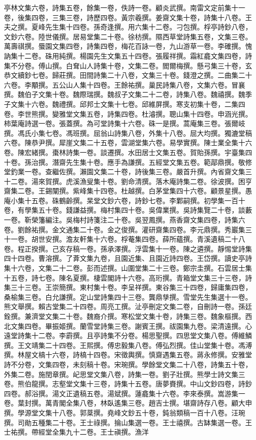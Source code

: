\begin{pinyinscope}
亭林文集六卷，詩集五卷，餘集一卷，佚詩一卷。顧炎武撰。南雷文定前集十一卷，後集四卷，三集三卷，詩歷四卷。黃宗羲撰。姜齋文集十卷，詩集十八卷。王夫之撰。夏峰先生集十四卷。孫奇逢撰。用六集十二卷。刁包撰。桴亭詩鈔八卷，文鈔六卷。陸世儀撰。居易堂集二十卷。徐枋撰。隰西草堂詩集五卷，文集三卷。萬壽祺撰。蜃園文集四卷，詩集四卷，梅花百詠一卷，九山游草一卷。李確撰。愧訥集十二卷。硃用純撰。楊園先生文集五十四卷。張履祥撰。霜紅龕文集四卷，詩集不分卷。傅山撰。白耷山人詩集十卷，文集二卷。閻爾梅撰。懸弓集三十卷，玄恭文續鈔七卷。歸莊撰。田間詩集二十八卷，文集三十卷。錢澄之撰。二曲集二十六卷。李顒撰。五公山人集十四卷。王餘祐撰。巢民詩集八卷，文集六卷。冒襄撰。魏伯子文集十卷。魏際瑞撰。魏叔子文集二十二卷，詩集八卷。魏禧撰。魏季子文集十六卷。魏禮撰。邱邦士文集十七卷。邱維屏撰。寒支初集十卷，二集四卷。李世熊撰。變雅堂文集五卷，詩集四卷。杜濬撰。聰山集十四卷。申涵光撰。柿葉庵詩選一卷。張蓋撰。為可堂詩集十六卷。硃一是撰。蒿庵集三卷。張爾岐撰。馮氏小集七卷。馮班撰。屈翁山詩集八卷，外集十八卷。屈大均撰。獨漉堂稿六卷。陳恭尹撰。犀崖文集二十五卷，雲湖堂集六卷。易學實撰。陳士業全集十六卷。陳宏緒撰。棗林詩集一卷。談遷撰。水田居士文集五卷。賀貽孫撰。宇臺集四十卷。孫治撰。潛齋先生集十卷。應手為謙撰。五經堂文集五卷。範鄗鼎撰。敬修堂釣業一卷。查繼佐撰。瀨園文集二十卷，詩後集三卷。嚴首升撰。內省齋文集三十二卷。湯來賀撰。虎溪漁叟集十卷。劉命清撰。落木庵詩集二卷。徐波撰。困亨齋集二卷。王錫闡撰。紫峰集十四卷。杜越撰。白茅堂集四十六卷。顧景星撰。愚庵小集十五卷。硃鶴齡撰。杲堂文鈔六卷，詩鈔七卷。李鄴嗣撰。初學集一百十卷，有學集五十卷。錢謙益撰。梅村集四十卷。吳偉業撰。吳詩集覽二十卷，談藪一卷。靳榮籓編注。吳梅村詩箋注二十卷。吳翌鳳撰。燕香齋文集四卷，詩集六卷。劉餘祐撰。金文通集二十卷。金之俊撰。灌研齋集四卷。李元鼎撰。秀巖集三十一卷。胡世安撰。澹友軒集十六卷。桴菴集四卷。薛所蘊撰。青溪遺稿二十八卷。程正揆撰。己亥存稿一卷。孫承澤撰。浮雲集十一卷。陳之遴撰。靜惕堂詩集四十四卷。曹溶撰。了葊文集九卷，且園近集、且園近詩四卷。王岱撰。讀史亭詩集十六卷，文集二十二卷。彭而述撰。山圍堂集二十三卷。鄭宗圭撰。石雲居士集十五卷，詩七卷。陳名夏撰。棲雲閣詩十六卷。高珩撰。青箱堂文集三十三卷，詩集三十三卷。王崇簡撰。東村集十卷。李呈祥撰。東谷集三十四卷，歸庸集四卷，桑榆集三卷。白允謙撰。定山堂詩集四十三卷。龔鼎孳撰。雪堂先生集選十一卷。熊文舉撰。賴古堂集二十四卷。周亮工撰。沚亭刪定文集二卷，自刪詩一卷。孫廷銓撰。兼濟堂文集二十卷。魏裔介撰。寒松堂文集十卷，詩集三卷。魏象樞撰。西北文集四卷。畢振姬撰。蘭雪堂詩集三卷。謝賓王撰。祓園集九卷。梁清遠撰。心遠堂詩集十二卷。李霨撰。且亭詩集不分卷。楊思聖撰。四思堂文集八卷。傅維鱗撰。王文靖集二十四卷。王熙撰。傅忠毅集八卷。傅弘烈撰。佳山堂集十卷。馮溥撰。林屋文槁十六卷，詩槁十四卷。宋徵輿撰。慎齋遇集五卷。蔣永修撰。安雅堂詩不分卷，文集四卷，未刻稿十卷。宋琬撰。學餘堂文集二十八卷，詩集五十卷，外集二卷。施閏章撰。屺思堂文集八卷，詩集一卷。劉子壯撰。熊學士詩文集三卷。熊伯龍撰。志壑堂文集十三卷，詩集十五卷。唐夢賚撰。中山文鈔四卷，詩鈔四卷。郝浴撰。湯文正遺稿五卷。湯斌撰。蓮龕集十六卷。李來泰撰。嵩游集一卷。葉封撰。萬青閣全集八卷，林臥遙集三卷。趙吉士撰。堪齋詩存八卷。顧大申撰。學源堂文集十八卷。郭棻撰。堯峰文鈔五十卷，鈍翁類稿一百十八卷。汪琬撰。司勛五種集二十卷。王士祿撰。掄山集選一卷。王士禧撰。古缽集選一卷。王士祐撰。帶經堂全集九十二卷。王士禛撰。漁洋
\end{pinyinscope}
